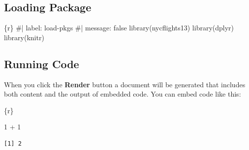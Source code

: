 \documentclass[
  letterpaper,
  DIV=11,
  numbers=noendperiod]{scrreprt}
\newenvironment{Shaded}{\begin{snugshade}}{\end{snugshade}}
\newcommand{\CommentTok}[1]{\textcolor[rgb]{0.37,0.37,0.37}{#1}}
\newcommand{\DecValTok}[1]{\textcolor[rgb]{0.68,0.00,0.00}{#1}}
\newcommand{\FunctionTok}[1]{\textcolor[rgb]{0.28,0.35,0.67}{#1}}
\newcommand{\InformationTok}[1]{\textcolor[rgb]{0.37,0.37,0.37}{#1}}
\newcommand{\NormalTok}[1]{\textcolor[rgb]{0.00,0.23,0.31}{#1}}
\newcommand{\SpecialCharTok}[1]{\textcolor[rgb]{0.37,0.37,0.37}{#1}}
\begin{document}
\begin{tcolorbox}[enhanced jigsaw, colframe=quarto-callout-important-color-frame, breakable, colback=white, toprule=.15mm, leftrule=.75mm, title={Task 6 (message: false is `Challenge')}, left=2mm, coltitle=black, bottomtitle=1mm, bottomrule=.15mm, rightrule=.15mm, colbacktitle=quarto-callout-important-color!10!white, opacitybacktitle=0.6, opacityback=0, toptitle=1mm, arc=.35mm, titlerule=0mm]

\hypertarget{loading-package}{%
\subsection*{Loading Package}\label{loading-package}}

\begin{Shaded}
\begin{Highlighting}[]
\InformationTok{\textasciigrave{}\textasciigrave{}\textasciigrave{}\{r\}}
\CommentTok{\#| label: load{-}pkgs}
\CommentTok{\#| message: false}
\FunctionTok{library}\NormalTok{(nycflights13)}
\FunctionTok{library}\NormalTok{(dplyr)}
\FunctionTok{library}\NormalTok{(knitr)}
\InformationTok{\textasciigrave{}\textasciigrave{}\textasciigrave{}}
\end{Highlighting}
\end{Shaded}

\end{tcolorbox}

\hypertarget{running-code}{%
\subsection*{Running Code}\label{running-code}}

When you click the \textbf{Render} button a document will be generated
that includes both content and the output of embedded code. You can
embed code like this:

\begin{Shaded}
\begin{Highlighting}[]
\InformationTok{\textasciigrave{}\textasciigrave{}\textasciigrave{}\{r\}}

\DecValTok{1} \SpecialCharTok{+} \DecValTok{1}
\InformationTok{\textasciigrave{}\textasciigrave{}\textasciigrave{}}
\end{Highlighting}
\end{Shaded}

\begin{verbatim}
[1] 2
\end{verbatim}
\end{document}
